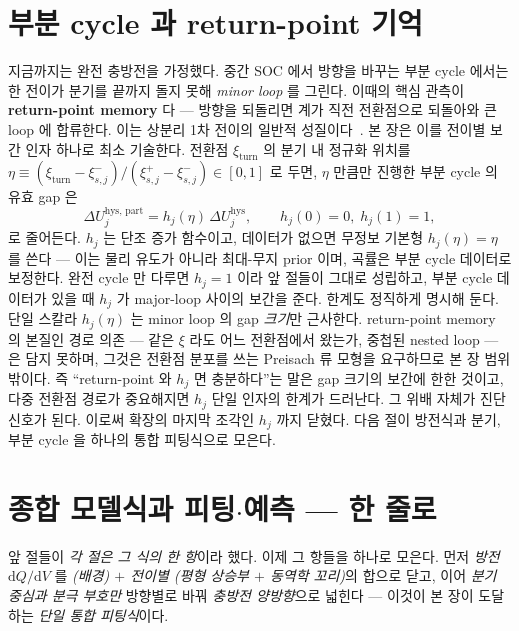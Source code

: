 \documentclass[11pt,a4paper]{article}
\newcommand{\dd}{\mathrm{d}}
\newcommand{\hys}{\mathrm{hys}}
\begin{document}
\section{부분 cycle 과 return-point 기억}\label{sec:hys_partial}
지금까지는 완전 충방전을 가정했다. 중간 SOC 에서 방향을 바꾸는 부분 cycle 에서는 한 전이가 분기를 끝까지 돌지
못해 \emph{minor loop} 를 그린다. 이때의 핵심 관측이 \textbf{return-point memory} 다 — 방향을 되돌리면 계가
직전 전환점으로 되돌아와 큰 loop 에 합류한다. 이는 상분리 1차 전이의 일반적 성질이다~\cite{sethna1993}. 본 장은
이를 전이별 보간 인자 하나로 최소 기술한다. 전환점 $\xi_\mathrm{turn}$ 의 분기 내 정규화 위치를
$\eta\equiv(\xi_\mathrm{turn}-\xi_{s,j}^-)/(\xi_{s,j}^+-\xi_{s,j}^-)\in[0,1]$ 로 두면, $\eta$ 만큼만 진행한
부분 cycle 의 유효 gap 은
\begin{equation}
\Delta U_{j}^{\hys,\,\mathrm{part}}=h_j(\eta)\,\Delta U_j^\hys,\qquad h_j(0)=0,\;h_j(1)=1,
\label{eq:hys_partial}
\end{equation}
로 줄어든다. $h_j$ 는 단조 증가 함수이고, 데이터가 없으면 무정보 기본형 $h_j(\eta)=\eta$ 를 쓴다 — 이는 물리
유도가 아니라 최대-무지 prior 이며, 곡률은 부분 cycle 데이터로 보정한다. 완전 cycle 만 다루면 $h_j=1$ 이라 앞
절들이 그대로 성립하고, 부분 cycle 데이터가 있을 때 $h_j$ 가 major-loop 사이의 보간을 준다. 한계도 정직하게
명시해 둔다. 단일 스칼라 $h_j(\eta)$ 는 minor loop 의 gap \emph{크기}만 근사한다. return-point memory 의
본질인 경로 의존 — 같은 $\xi$ 라도 어느 전환점에서 왔는가, 중첩된 nested loop — 은 담지 못하며, 그것은 전환점
분포를 쓰는 Preisach 류 모형을 요구하므로 본 장 범위 밖이다. 즉 ``return-point 와 $h_j$ 면 충분하다''는 말은
gap 크기의 보간에 한한 것이고, 다중 전환점 경로가 중요해지면 $h_j$ 단일 인자의 한계가 드러난다. 그 위배 자체가
진단 신호가 된다. 이로써 확장의 마지막 조각인 $h_j$ 까지 닫혔다. 다음 절이 방전식과 분기, 부분 cycle 을 하나의
통합 피팅식으로 모은다.

\section{종합 모델식과 피팅$\cdot$예측 — 한 줄로}\label{sec:master}
앞 절들이 \emph{각 절은 그 식의 한 항}이라 했다. 이제 그 항들을 하나로 모은다. 먼저 \emph{방전} $\dd Q/\dd V$ 를
\emph{(배경) $+$ 전이별 (평형 상승부 $+$ 동역학 꼬리)}의 합으로 닫고, 이어 \emph{분기 중심과 분극 부호만} 방향별로
바꿔 \emph{충방전 양방향}으로 넓힌다 — 이것이 본 장이 도달하는 \emph{단일 통합 피팅식}이다.
\end{document}
